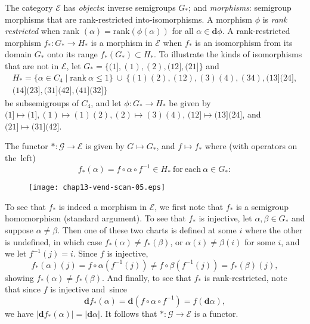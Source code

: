 \documentclass{surv-l}
\numberwithin{equation}{section}
\numberwithin{table}{section}
\numberwithin{figure}{section}
\theoremstyle{definition}
\begin{document}
The category $\mathcal{E}$ has \emph{objects}: inverse semigroups
$G_{\ast}$; and \emph{morphisms}: semigroup morphisms that are
rank-restricted into-isomorphisms. A morphism $\phi$ is \emph{rank
restricted} when rank $(\alpha)=
\mathrm{rank }(\phi(\alpha))$ for all $\alpha\in \mathbf{d}\phi$.
A rank-restricted morphism $f_{\ast}:G_{\ast}\rightarrow H_{\ast}$
is a morphism in $\mathcal{E}$ when $f_{\ast}$ is an isomorphism
from its domain $G_{\ast}$ onto its range
$f_{\ast}(G_{\ast})\subset H_{\ast}$. To illustrate the kinds of
isomorphisms that are not in $\mathcal{E}$, let
$G_{\ast}=\{(1],(1),(2),(12],(21]\}$ and
\begin{align*}
H_{\ast}=\{\alpha\in C_{4}\mid \mathrm{rank}\ \alpha\leq 1\}\ \cup\ \{(1)(2),(12),(3)(4),(34),(13](24], \\
(14](23],(31](42],(41](32]\}
\end{align*}
be subsemigroups of $C_{4}$, and let $\phi :
G_{\ast}\rightarrow H_{\ast}$ be given by $(1]\mapsto(1],(1)
\mapsto (1)(2),(2)\mapsto (3)(4)$, $(12]\mapsto (13](24]$, and
$(21]\mapsto (31](42]$.

The functor $*:\mathcal{G}\rightarrow \mathcal{E}$ is given by
$G\mapsto G_{\ast}$, and $f\mapsto f_{\ast}$ where (with
operators on the~left)
\begin{equation*}
f_{\ast}(\alpha)=f\circ \alpha \circ f^{-1}\in H_{\ast}\ \mathrm{for\ each}\ \alpha\in G_{\ast}:
\end{equation*}
\begin{figure}[!h]
\texttt{[image: chap13-vend-scan-05.eps]}
\end{figure}

\noindent To see that $f_{\ast}$ is indeed a morphism in $\mathcal{E}$,
we first note that $f_{\ast}$ is a semigroup homomorphism
(standard argument). To see that $f_{\ast}$ is injective, let
$\alpha,\beta\in G_{\ast}$ and suppose $\alpha\neq\beta$. Then
one of these two charts is defined at some $i$ where the other
is undefined, in which case $f_{\ast}(\alpha)\neq
f_{\ast}(\beta)$, or $\alpha(i)\neq\beta(i)$ for some $i$, and
we let $f^{-1}(j)=i$. Since $f$ is injective,
\[
f_{\ast}(\alpha)(j)=f\circ \alpha(f^{-1}(j))\neq f\circ \beta(f^{-1}(j))=f_{\ast}(\beta)(j),
\]
showing $f_{\ast}(\alpha)\neq f_{\ast}(\beta)$. And finally,
to see that $f_{\ast}$ is rank-restricted, note that since $f$
is injective and~since
\[
\mathbf{d}f_{\ast}(\alpha)=\mathbf{d}(f\circ \alpha \circ f^{-1})=f(\mathbf{d}\alpha),
\]
we have $|\mathbf{d}f_{\ast}(\alpha)|=|\mathbf{d}\alpha|$. It
follows that $*:\mathcal{G}\rightarrow \mathcal{E}$ is a
functor.
\end{document}
